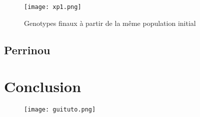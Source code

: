 \documentclass{article}
\begin{document}
	\begin{figure}[h]
	\label{xp1}
	\caption[test]{Genotypes finaux à partir de la même population initial}
	\centering
	\texttt{[image: xp1.png]}
	\end{figure}




	\subsection{Perrinou}


	\section {Conclusion}

		\begin{figure}[p]
	\label{figure3}
	\vspace*{-3cm}
	\caption[test]{}
	\texttt{[image: guituto.png]}
	\end{figure}
	
\end{document}
